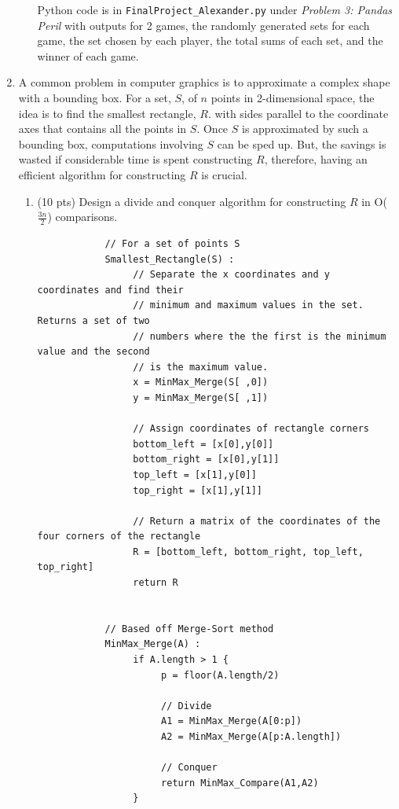\documentclass[12pt]{article}
\begin{document}
\begin{enumerate}
\begin{enumerate}
	{\color{blue}
		Python code is in \texttt{FinalProject\_Alexander.py} under \emph{Problem 3: Pandas Peril} with outputs for 2 games, the randomly generated sets for each game, the set chosen by each player, the total sums of each set, and the winner of each game.
	}\newpage

\end{enumerate}

\item A common problem in computer graphics is to approximate a complex shape with a bounding box. For a set, $S$, of $n$ points in 2-dimensional space, the idea is to find the smallest rectangle, $R$. with sides parallel to the coordinate axes that contains all the points in $S$. Once $S$ is approximated by such a bounding box, computations involving $S$ can be sped up. But, the savings is wasted if considerable time is spent constructing $R$, therefore, having an efficient algorithm for constructing $R$ is crucial. 
\begin{enumerate}
\item (10 pts) Design a divide and conquer algorithm for constructing $R$ in O($\frac{3n}{2}$) comparisons.

	{\color{blue}
		\begin{small}
		\begin{verbatim}
			// For a set of points S
			Smallest_Rectangle(S) :
			     // Separate the x coordinates and y coordinates and find their
			     // minimum and maximum values in the set. Returns a set of two
			     // numbers where the the first is the minimum value and the second
			     // is the maximum value.
			     x = MinMax_Merge(S[ ,0])
			     y = MinMax_Merge(S[ ,1])

			     // Assign coordinates of rectangle corners
			     bottom_left = [x[0],y[0]]
			     bottom_right = [x[0],y[1]]
			     top_left = [x[1],y[0]]
			     top_right = [x[1],y[1]]

			     // Return a matrix of the coordinates of the four corners of the rectangle
			     R = [bottom_left, bottom_right, top_left, top_right]			
			     return R


			// Based off Merge-Sort method
			MinMax_Merge(A) :
			     if A.length > 1 {
			          p = floor(A.length/2)

			          // Divide
			          A1 = MinMax_Merge(A[0:p])
			          A2 = MinMax_Merge(A[p:A.length])

			          // Conquer
			          return MinMax_Compare(A1,A2)
			     }


\end{verbatim}
\end{small}}
\end{enumerate}
\end{enumerate}
\end{document}
